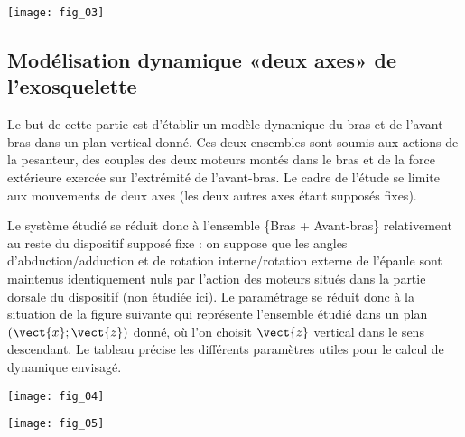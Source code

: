\begin{center}
\texttt{[image: fig\_03]}
\end{center}


\subsection*{Modélisation dynamique «deux axes» de l’exosquelette}
\begin{obj}
Le but de cette partie est d’établir un modèle dynamique du bras et de l’avant-bras dans un plan vertical
donné. Ces deux ensembles sont soumis aux actions de la pesanteur, des couples des deux moteurs montés
dans le bras et de la force extérieure exercée sur l’extrémité de l’avant-bras. Le cadre de l’étude se limite
aux mouvements de deux axes (les deux autres axes étant supposés fixes).
\end{obj}

Le système étudié se réduit donc à l’ensemble \{Bras + Avant-bras\} relativement au reste du dispositif supposé
fixe : on suppose que les angles d’abduction/adduction et de rotation interne/rotation externe de l’épaule sont
maintenus identiquement nuls par l’action des moteurs situés dans la partie dorsale du dispositif (non étudiée
ici). Le paramétrage se réduit donc à la situation de la figure suivante qui représente l’ensemble étudié dans un plan
$\left(\vect{x};\vect{z} \right)$ donné, où l’on choisit $\vect{z}$ vertical dans le sens descendant. Le tableau précise les différents
paramètres utiles pour le calcul de dynamique envisagé.

\begin{center}
\texttt{[image: fig\_04]}
\end{center}


\begin{center}
\texttt{[image: fig\_05]}
\end{center}



